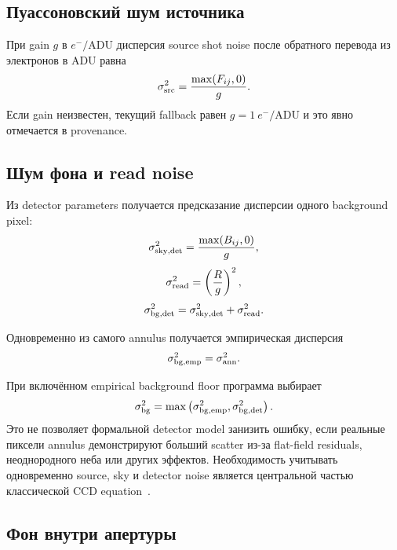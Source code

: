 \subsection{Пуассоновский шум источника}

При gain $g$ в $e^-/\mathrm{ADU}$ дисперсия source shot noise после обратного перевода из электронов в ADU равна
\begin{equation}
  \sigma^2_{\rm src}=\frac{\max(F_{ij},0)}{g}.
\end{equation}
Если gain неизвестен, текущий fallback равен $g=1\ e^-/\mathrm{ADU}$ и это явно отмечается в provenance.

\subsection{Шум фона и read noise}

Из detector parameters получается предсказание дисперсии одного background pixel:
\begin{equation}
  \sigma^2_{\rm sky,det}=\frac{\max(B_{ij},0)}{g},
\end{equation}
\begin{equation}
  \sigma^2_{\rm read}=\left(\frac{R}{g}\right)^2,
\end{equation}
\begin{equation}
  \sigma^2_{\rm bg,det}=\sigma^2_{\rm sky,det}+\sigma^2_{\rm read}.
\end{equation}

Одновременно из самого annulus получается эмпирическая дисперсия
\begin{equation}
  \sigma^2_{\rm bg,emp}=\sigma_{\rm ann}^2.
\end{equation}

При включённом empirical background floor программа выбирает
\begin{equation}
  \sigma^2_{\rm bg}=\max\left(
  \sigma^2_{\rm bg,emp},\sigma^2_{\rm bg,det}
  \right).
\end{equation}
Это не позволяет формальной detector model занизить ошибку, если реальные пиксели annulus демонстрируют больший scatter из-за flat-field residuals, неоднородного неба или других эффектов. Необходимость учитывать одновременно source, sky и detector noise является центральной частью классической CCD equation~\cite{howell1989}.

\subsection{Фон внутри апертуры}


